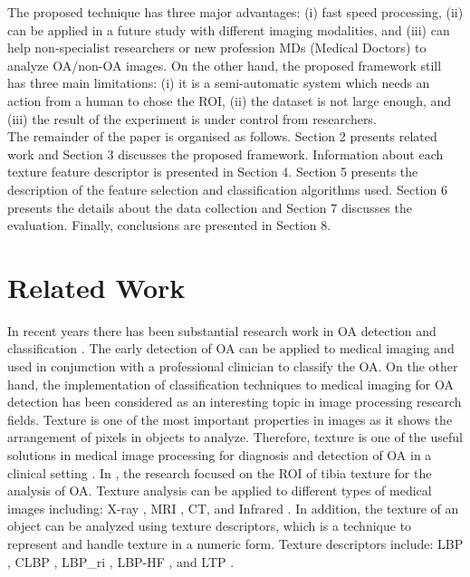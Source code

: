 \documentclass[review]{elsarticle}
\begin{document}
The proposed technique has three major advantages: (i) fast speed processing, (ii) can be applied in a future study with different imaging modalities, and (iii) can help non-specialist researchers or new profession MDs (Medical Doctors) to analyze OA/non-OA images. On the other hand, the proposed framework still has three main limitations: (i) it is a semi-automatic system which needs an action from a human to chose the ROI, (ii) the dataset is not large enough, and (iii) the result of the experiment is under control from researchers.\\

The remainder of the paper is organised as follows. Section 2 presents related work and Section 3 discusses the proposed framework. Information about each texture feature descriptor is presented in Section 4. Section 5 presents the description of the feature selection and classification algorithms used. Section 6 presents the details about the data collection and Section 7 discusses the evaluation. Finally, conclusions are presented in Section 8. 

\section{Related Work}

In recent years there has been substantial research work in OA detection and classification \cite{Wolski2010, Jin2013, Shamir2009, S.2016, Kotti2017}. The early detection of OA can be applied to medical imaging and used in conjunction with a professional clinician to classify the OA. On the other hand, the implementation of classification techniques to medical imaging for OA detection has been considered as an interesting topic in image processing research fields. Texture is one of the most important properties in images as it shows the arrangement of pixels in objects to analyze. Therefore, texture is one of the useful solutions in medical image processing for diagnosis and detection of OA in a clinical setting \cite{Castellano2004, Janvier2015}. In \cite{Wolski2010}, the research focused on the ROI of tibia texture for the analysis of OA. Texture analysis can be applied to different types of medical images including: X-ray \cite{Wolski2010}, MRI \cite{Chuah2011}, CT, and Infrared \cite{Jin2013}. In addition, the texture of an object can be analyzed using texture descriptors, which is a technique to represent and handle texture in a numeric form. Texture descriptors include: LBP \cite{Castellano2004, Dittakan2016, Kachouie2007}, CLBP \cite{Guo2010}, LBP\_ri \cite{Varney2015}, LBP-HF \cite{Prasad2016}, and LTP \cite{Tan2010, Wang2014}. \\
\end{document}
